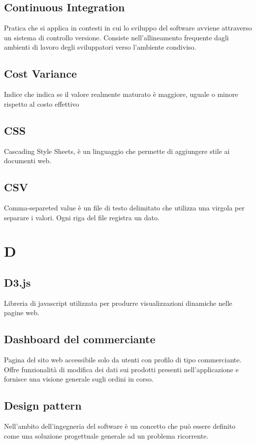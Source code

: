 \subsection*{Continuous Integration}
Pratica che si applica in contesti in cui lo sviluppo del software avviene attraverso un sistema di controllo versione. Consiste nell'allineamento frequente dagli ambienti di lavoro degli sviluppatori verso l'ambiente condiviso.

\subsection*{Cost Variance}
Indice che indica se il valore realmente maturato è maggiore, uguale o minore rispetto al costo effettivo

\subsection*{CSS}
Cascading Style Sheets, è un linguaggio che permette di aggiungere stile ai documenti web.

\subsection*{CSV}
Comma-separeted value è un file di testo delimitato che utilizza una virgola per separare i valori. Ogni riga del file registra un dato.

\section*{D}
\subsection*{D3.js}
Libreria di javascript utilizzata per produrre visualizzazioni dinamiche nelle pagine web.

\subsection*{Dashboard del commerciante}
Pagina del sito web accessibile solo da utenti con profilo di tipo commerciante. Offre funzionalità di modifica dei dati sui prodotti presenti nell'applicazione e fornisce una visione generale sugli ordini in corso.

\subsection*{Design pattern}
Nell’ambito dell’ingegneria del software è un concetto che può essere definito come una soluzione progettuale generale ad un problema ricorrente.

